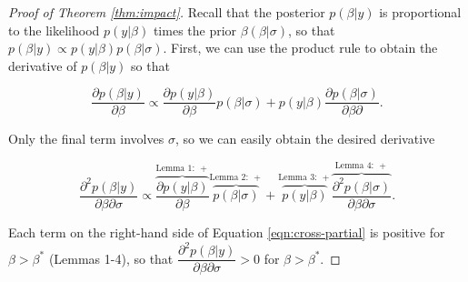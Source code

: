 \documentclass[12pt]{article}
\begin{document}
\begin{appendix}
\begin{proof}[Proof of Theorem \ref{thm:impact}]
Recall that the posterior $p(\beta | y)$ is proportional to the likelihood $p(y | \beta)$ times the prior $\beta(\beta | \sigma)$, so that $p(\beta | y) \propto p(y|\beta)p(\beta | \sigma)$. First, we can use the product rule to obtain the derivative of $p(\beta | y)$ so that 

\begin{equation}\nonumber
\dfrac{\partial p(\beta | y)}{\partial \beta} \propto \dfrac{\partial p(y | \beta)}{\partial \beta} p(\beta | \sigma) + p(y | \beta)\dfrac{\partial p(\beta | \sigma)}{\partial \beta \partial}\text{}.
\end{equation}

\noindent Only the final term involves $\sigma$, so we can easily obtain the desired derivative

\begin{equation}\label{eqn:cross-partial}
\dfrac{\partial^2 p(\beta | y)}{\partial \beta \partial \sigma} \propto \overbrace{\dfrac{\partial p(y | \beta)}{\partial \beta}}^{\text{Lemma 1}:~+} \overbrace{p(\beta | \sigma)}^{\text{Lemma 2}:~+} + \overbrace{p(y | \beta)}^{\text{Lemma 3}:~+} \overbrace{\dfrac{\partial^2 p(\beta | \sigma)}{\partial \beta \partial \sigma}}^{\text{Lemma 4}:~+}\text{.}
\end{equation}

\noindent Each term on the right-hand side of Equation \ref{eqn:cross-partial} is positive  for $\beta > \beta^*$ (Lemmas 1-4), so that $\dfrac{\partial^2 p(\beta | y)}{\partial \beta \partial \sigma} > 0$ for $\beta > \beta^*$.

\end{proof}

\end{appendix}
\end{document}
